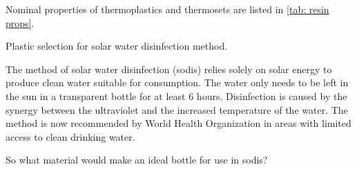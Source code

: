 \documentclass[
10pt,
a4paper,
openany,
svgnames,
]{book}
\begin{document}
Nominal properties of thermoplastics and thermosets are listed in \cref{tab: resin props}.

\begin{example} Plastic selection for solar water disinfection method. \cite{sukkasi2014heat}
  
  The method of solar water disinfection (sodis) relies solely on solar energy to produce clean water suitable for consumption. The water only needs to be left in the sun in a transparent bottle for at least 6 hours. Disinfection is caused by the synergy between the ultraviolet and the increased temperature of the water. The method is now recommended by World Health Organization in areas with limited access to clean drinking water.

  So what material would make an ideal bottle for use in sodis?
\end{example}
\end{document}
